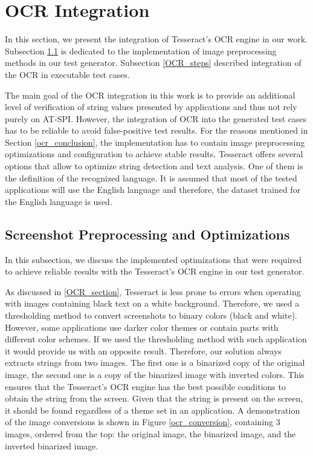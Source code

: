 
\section{OCR Integration}\label{OCR}
In this section, we present the integration of Tesseract's OCR engine in our work. Subsection \ref{OCR_optimizations} is dedicated to the implementation of image preprocessing methods in our test generator. Subsection \ref{OCR_steps} described integration of the OCR in executable test cases.  

The main goal of the OCR integration in this work is to provide an additional level of verification of string values presented by applications and thus not rely purely on AT-SPI.
However, the integration of OCR into the generated test cases has to be reliable to avoid false-positive test results. For the reasons mentioned in Section \ref{ocr_conclusion}, the implementation has to contain image preprocessing optimizations and configuration to achieve stable results. Tesseract offers several options that allow to optimize string detection and text analysis. One of them is the definition of the recognized language. It is assumed that most of the tested applications will use the English language and therefore, the dataset trained for the English language is used.

\subsection{Screenshot Preprocessing and Optimizations}\label{OCR_optimizations}
In this subsection, we discuss the implemented optimizations that were required to achieve reliable results with the Tesseract's OCR engine in our test generator.

As discussed in \ref{OCR_section}, Tesseract is less prone to errors when operating with images containing black text on a white background. Therefore, we used a thresholding method to convert screenshots to binary colors (black and white). However, some applications use darker color themes or contain parts with different color schemes. If we used the thresholding method with such application it would provide us with an opposite result. Therefore, our solution always extracts strings from two images. The first one is a binarized copy of the original image, the second one is a copy of the binarized image with inverted colors. This ensures that the Tesseract's OCR engine has the best possible conditions to obtain the string from the screen. Given that the string is present on the screen, it should be found regardless of a theme set in an application. A demonstration of the image conversions is shown in Figure \ref{ocr_conversion}, containing 3 images, ordered from the top: the original image, the binarized image, and the inverted binarized image. 

